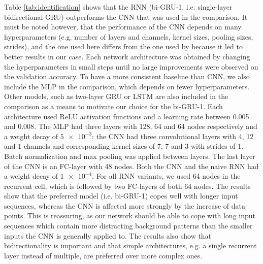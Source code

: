 Table \ref{tab:identification} shows that the RNN (bi-GRU-1, i.e. single-layer bidirectional GRU) outperforms the CNN that was used in the comparison. It must be noted however, that the performance of the CNN depends on many hyperparameters (e.g. number of layers and channels, kernel sizes, pooling sizes, strides), and the one used here differs from the one used by \cite{pearson2018searching} because it led to better results in our case. Each network architecture was obtained by changing the hyperparameters in small steps until no large improvements were observed on the validation accuracy. To have a more consistent baseline than CNN, we also include the MLP in the comparison, which depends on fewer hyperparameters. Other models, such as two-layer GRU or LSTM are also included in the comparison as a means to motivate our choice for the bi-GRU-1. Each architecture used ReLU activation functions and a learning rate between 0.005 and 0.008. The MLP had three layers with 128, 64 and 64 nodes respectively and a weight decay of $\num{5e-3}$; the CNN had three convolutional layers with 4, 12 and 1 channels and corresponding kernel sizes of 7, 7 and 3 with strides of 1. Batch normalization and max pooling was applied between layers. The last layer of the CNN is an FC-layer with 48 nodes. Both the CNN and the naive RNN had a weight decay of $\num{1e-4}$. For all RNN variants, we used 64 nodes in the recurrent cell, which is followed by two FC-layers of both 64 nodes. The results show that the preferred model (i.e. bi-GRU-1) copes well with longer input sequences, whereas the CNN is affected more strongly by the increase of data points. This is reassuring, as our network should be able to cope with long input sequences which contain more distracting background patterns than the smaller inputs the CNN is generally applied to. The results also show that bidirectionality is important and that simple architectures, e.g. a single recurrent layer instead of multiple, are preferred over more complex ones.

